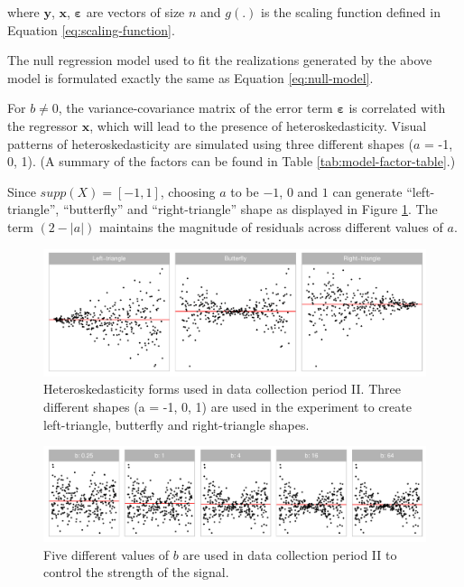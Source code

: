 \documentclass[]{interact}
\theoremstyle{plain}%
\theoremstyle{definition}
\theoremstyle{remark}
\begin{document}
\noindent where \(\boldsymbol{y}\), \(\boldsymbol{x}\),
\(\boldsymbol{\varepsilon}\) are vectors of size \(n\) and \(g(.)\) is
the scaling function defined in Equation \ref{eq:scaling-function}.

The null regression model used to fit the realizations generated by the
above model is formulated exactly the same as Equation
\ref{eq:null-model}.

For \(b \neq 0\), the variance-covariance matrix of the error term
\(\boldsymbol{\varepsilon}\) is correlated with the regressor
\(\boldsymbol{x}\), which will lead to the presence of
heteroskedasticity. Visual patterns of heteroskedasticity are simulated
using three different shapes (\(a\) = -1, 0, 1). (A summary of the
factors can be found in Table \ref{tab:model-factor-table}.)

Since \(supp(X) = [-1, 1]\), choosing \(a\) to be \(-1\), \(0\) and
\(1\) can generate ``left-triangle'', ``butterfly'' and
``right-triangle'' shape as displayed in Figure
\ref{fig:different-shape-of-heter}. The term \((2 - |a|)\) maintains the
magnitude of residuals across different values of \(a\).

\begin{figure}

{\centering \includegraphics[width=1\linewidth]{paper_comparison_files/figure-latex/different-shape-of-heter-1} 

}

\caption{Heteroskedasticity forms used in data collection period II. Three different shapes (a = -1, 0, 1) are used in the experiment to create left-triangle, butterfly and right-triangle shapes.}\label{fig:different-shape-of-heter}
\end{figure}

\begin{figure}

{\centering \includegraphics[width=1\linewidth]{paper_comparison_files/figure-latex/different-b-1} 

}

\caption{Five different values of $b$ are used in data collection period II to control the strength of the signal.}\label{fig:different-b}
\end{figure}
\end{document}
